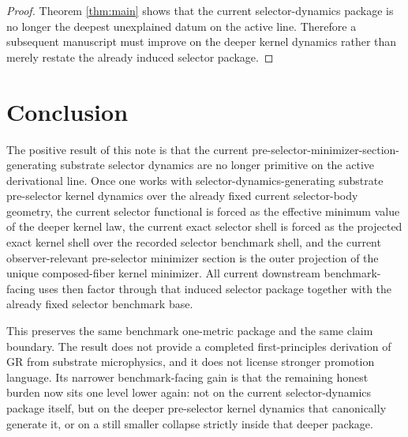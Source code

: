 \documentclass[11pt]{article}
\begin{document}
\begin{proof}
Theorem \ref{thm:main} shows that the current selector-dynamics package is no longer the deepest unexplained datum on the active line. Therefore a subsequent manuscript must improve on the deeper kernel dynamics rather than merely restate the already induced selector package.
\end{proof}

\section{Conclusion}

The positive result of this note is that the current pre-selector-minimizer-section-generating substrate selector dynamics are no longer primitive on the active derivational line. Once one works with selector-dynamics-generating substrate pre-selector kernel dynamics over the already fixed current selector-body geometry, the current selector functional is forced as the effective minimum value of the deeper kernel law, the current exact selector shell is forced as the projected exact kernel shell over the recorded selector benchmark shell, and the current observer-relevant pre-selector minimizer section is the outer projection of the unique composed-fiber kernel minimizer. All current downstream benchmark-facing uses then factor through that induced selector package together with the already fixed selector benchmark base.

This preserves the same benchmark one-metric package and the same claim boundary. The result does not provide a completed first-principles derivation of GR from substrate microphysics, and it does not license stronger promotion language. Its narrower benchmark-facing gain is that the remaining honest burden now sits one level lower again: not on the current selector-dynamics package itself, but on the deeper pre-selector kernel dynamics that canonically generate it, or on a still smaller collapse strictly inside that deeper package.
\end{document}
